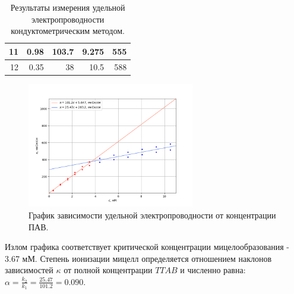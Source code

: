 \documentclass[a4paper,12pt]{article}
\begin{document}
\begin{table}[h!]
\begin{tabular}{|r|r|r|r|r|}
11                      & 0.98                       & 103.7                                            & 9.275                      & 555                                            \\ \hline
12                      & 0.35                       & 38                                               & 10.5                       & 588                                            \\ \hline
\end{tabular}
\caption{Результаты измерения удельной электропроводности кондуктометрическим методом.}
\label{tab:my-table}
\end{table}

\begin{figure}[h!]
    \centering
    \includegraphics[width = 0.65\textwidth]{data 1.png}
    \caption{График зависимости удельной электропроводности от концентрации ПАВ. }
    \label{fig:no_int}
\end{figure}

        
 Излом графика соответствует критической концентрации мицелообразования - 3.67 мМ. Степень ионизации мицелл определяется отношением наклонов
зависимостей $\kappa$ от полной концентрации $TTAB$ и численно равна:
$\alpha = \frac{k_2}{k_1} = \frac{25.47}{101.2} = 0.090$.
\end{document}
